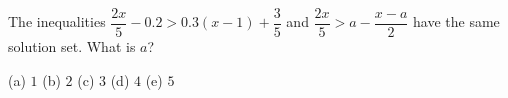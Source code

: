 The inequalities $\dfrac{2x}{5}-0.2>0.3(x-1)+\dfrac{3}{5}$ and $\dfrac{2x}{5}>a-\dfrac{x-a}{2}$ have the same solution set. What is $a$?

(a) $1$ \quad (b) $2$ \quad (c) $3$ \quad (d) $4$ \quad (e) $5$
